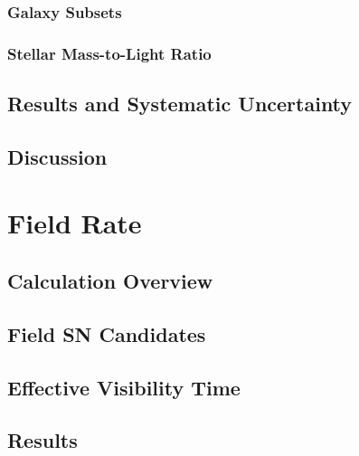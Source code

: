 \documentclass[12pt]{ucthesis}
\begin{document}
\subsection{Galaxy Subsets} \label{sec:lum_subsets}


\subsection{Stellar Mass-to-Light Ratio} \label{sec:lum_mass}



\section{Results and Systematic Uncertainty} \label{sec:clrate_results}


\section{Discussion} \label{sec:clrate_discussion}



\chapter{Field Rate} \label{sec:fieldrate}

\section{Calculation Overview} \label{sec:fieldrate_overview}


\section{Field SN Candidates} \label{sec:fieldrate_cands}


\section{Effective Visibility Time} \label{sec:fieldrate_ct}


\section{Results} \label{sec:fieldrate_results}

\end{document}
